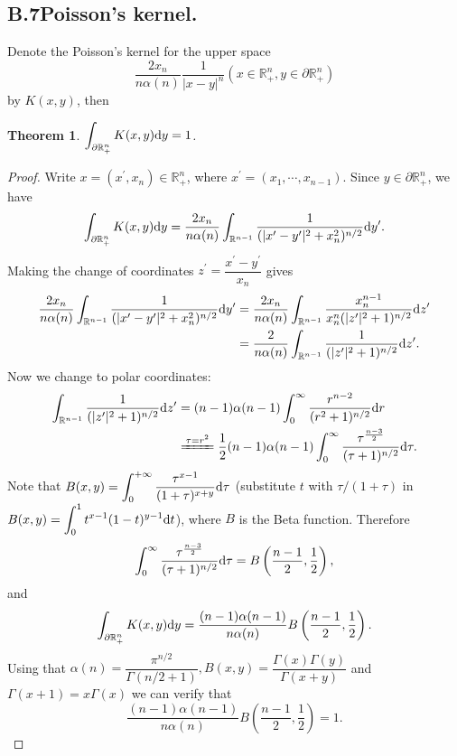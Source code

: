 \documentclass[hyperref,UTF8,12pt]{article}
\numberwithin{equation}{subsection}
\theoremstyle{plain}
\newtheorem{theorem}{Theorem}
\theoremstyle{definition}
\numberwithin{theorem}{section}
\numberwithin{lemma}{section}
\numberwithin{proposition}{section}
\numberwithin{remark}{section}
\numberwithin{corollary}{section}
\numberwithin{definition}{section}
\numberwithin{problem}{section}
\numberwithin{example}{section}
\def\dif{\textup{d}}
\newcommand{\dis}{\displaystyle}
\newcommand{\ptl}{\partial}
\newcommand{\mr}{\mathbb{R}}
\begin{document}
\begin{appendices}
\subsection*{B.7\quad Poisson's kernel.}
Denote the Poisson's kernel for the upper space
\[\frac{2x_n}{n\alpha(n)}\frac{1}{|x-y|^n}(x\in\mr_+^n,y\in\ptl\mr_+^n)\]by $K(x,y)$, then
\begin{theorem}\label{thmb7}
$\dis\int_{\ptl\mr_+^n}K(x,y)\dif y=1$.
\end{theorem}
\begin{proof}
Write $x=(x^\prime,x_n)\in\mr_+^n$, where $x^\prime=(x_1,\cdots,x_{n-1})$. Since $y\in\ptl\mr_+^n$, we have \[\int_{\ptl\mr_+^n}K(x,y)\dif y=\frac{2x_n}{n\alpha(n)} \int_{\mr^{n-1}}\frac{1}{(|x^\prime-y^\prime|^2+x_n^2)^{n/2}}\dif y^\prime.\]Making the change of coordinates $z^\prime=\dfrac{x^\prime-y^\prime}{x_n}$ gives\[
\begin{aligned}
	\frac{2x_n}{n\alpha(n)}\int_{\mr^{n-1}}\frac{1}{(|x^\prime-y^\prime|^2+x_n^2)^{n/2}}\dif y^\prime&=\frac{2x_n}{n\alpha(n)}\int_{\mr^{n-1}}\frac{x_n^{n-1}} {x_n^n(|z^\prime|^2+1)^{n/2}}\dif z^\prime\\
	&=\frac{2}{n\alpha(n)}\int_{\mr^{n-1}}\frac{1}{(|z^\prime|^2+1)^{n/2}}\dif z^\prime.
\end{aligned}\]Now we change to polar coordinates:\[\begin{aligned}
\int_{\mr^{n-1}}\frac{1}{(|z^\prime|^2+1)^{n/2}}\dif z^\prime&=(n-1)\alpha(n-1) \int_0^\infty\frac{r^{n-2}}{(r^2+1)^{n/2}}\dif r\\
&\xlongequal{\tau=r^2}\frac{1}{2}(n-1)\alpha(n-1)\int_0^\infty\frac{\tau^{\frac{n-3}{2}}}{(\tau+1)^{n/2}}\dif\tau.
\end{aligned}\]Note that $B(x,y)=\dis\int_0^{+\infty}\frac{\tau^{x-1}}{(1+\tau)^{x+y}}\dif\tau$ (substitute $t$ with $\tau/(1+\tau)$ in $B(x,y)=\dis\int_0^1t^{x-1}(1-t)^{y-1}\dif t$), where $B$ is the Beta function. Therefore\[\int_0^\infty\frac{\tau^{\frac{n-3}{2}}}{(\tau+1)^{n/2}}\dif\tau=B\left(\frac{n-1}{2},\frac{1}{2}\right),\]and\[\int_{\ptl\mr_+^n}K(x,y)\dif y=\frac{(n-1)\alpha(n-1)}{n\alpha(n)}B\left(\frac{n-1}{2},\frac{1}{2}\right).\]Using that $\alpha(n)=\dfrac{\pi^{n/2}}{\Gamma(n/2+1)},B(x,y)=\dfrac{\Gamma(x)\Gamma(y)} {\Gamma(x+y)}$ and $\Gamma(x+1)=x\Gamma(x)$ we can verify that
\[\frac{(n-1)\alpha(n-1)}{n\alpha(n)}B\left(\frac{n-1}{2},\frac{1}{2}\right)=1.\]
\end{proof}


\end{appendices}
\end{document}
